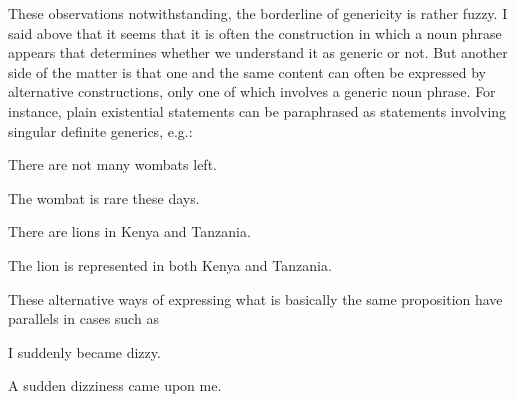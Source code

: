 \begin{styleBodyTextFirst}
These observations notwithstanding, the borderline of genericity is rather fuzzy. I said above that it seems that it is often the construction in which a noun phrase appears that determines whether we understand it as generic or not. But another side of the matter is that one and the same content can often be expressed by alternative constructions, only one of which involves a generic noun phrase. For instance, plain existential statements can be paraphrased as statements involving singular definite generics, e.g.:

\end{styleBodyTextFirst}

\begin{listWWNumileveli}
\item 

\begin{styleExample}
There are not many wombats left.

\end{styleExample}

\item 

\begin{styleExample}
The wombat is rare these days.

\end{styleExample}

\item 

\begin{styleExample}
There are lions in Kenya and Tanzania.

\end{styleExample}

\item 

\begin{styleExample}
The lion is represented in both Kenya and Tanzania. 

\end{styleExample}

\end{listWWNumileveli}

\begin{styleBodyTextFirst}
These alternative ways of expressing what is basically the same proposition have parallels in cases such as

\end{styleBodyTextFirst}

\begin{listWWNumileveli}
\item 

\begin{styleExample}
\label{bkm:Ref107116648}I suddenly became dizzy.

\end{styleExample}

\item 

\begin{styleExample}
\label{bkm:Ref107116651}A sudden dizziness came upon me.

\end{styleExample}

\end{listWWNumileveli}

